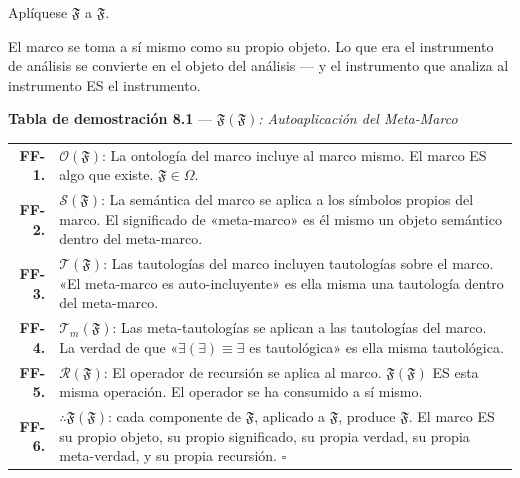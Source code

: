 \documentclass[10pt, openany, oneside]{book}
\renewcommand{\footnotesize}{\fontsize{8.5}{11}\selectfont}
\begin{document}
\vspace{1em}

\noindent Aplíquese $\mathfrak{F}$ a $\mathfrak{F}$.

El marco se toma a sí mismo como su propio objeto. Lo que era el instrumento de análisis se convierte en el objeto del análisis --- y el instrumento que analiza al instrumento ES el instrumento.

\vspace{0.5em}

\textbf{Tabla de demostración 8.1} --- \textit{$\mathfrak{F}(\mathfrak{F})$: Autoaplicación del Meta-Marco}

\vspace{0.5em}

{\footnotesize
\noindent\begin{tabular}{r p{}}
\textbf{FF-1.} & $\mathcal{O}(\mathfrak{F})$: La ontología del marco incluye al marco mismo. El marco ES algo que existe. $\mathfrak{F} \in \Omega$. \\[0.3em]
\textbf{FF-2.} & $\mathcal{S}(\mathfrak{F})$: La semántica del marco se aplica a los símbolos propios del marco. El significado de «meta-marco» es él mismo un objeto semántico dentro del meta-marco. \\[0.3em]
\textbf{FF-3.} & $\mathcal{T}(\mathfrak{F})$: Las tautologías del marco incluyen tautologías sobre el marco. «El meta-marco es auto-incluyente» es ella misma una tautología dentro del meta-marco. \\[0.3em]
\textbf{FF-4.} & $\mathcal{T}_m(\mathfrak{F})$: Las meta-tautologías se aplican a las tautologías del marco. La verdad de que «$\exists(\exists) \equiv \exists$ es tautológica» es ella misma tautológica. \\[0.3em]
\textbf{FF-5.} & $\mathcal{R}(\mathfrak{F})$: El operador de recursión se aplica al marco. $\mathfrak{F}(\mathfrak{F})$ ES esta misma operación. El operador se ha consumido a sí mismo. \\[0.3em]
\textbf{FF-6.} & $\therefore \mathfrak{F}(\mathfrak{F})$: cada componente de $\mathfrak{F}$, aplicado a $\mathfrak{F}$, produce $\mathfrak{F}$. El marco ES su propio objeto, su propio significado, su propia verdad, su propia meta-verdad, y su propia recursión. $\square$ \\[0.3em]
\end{tabular}
}

\vspace{0.8em}
\end{document}
